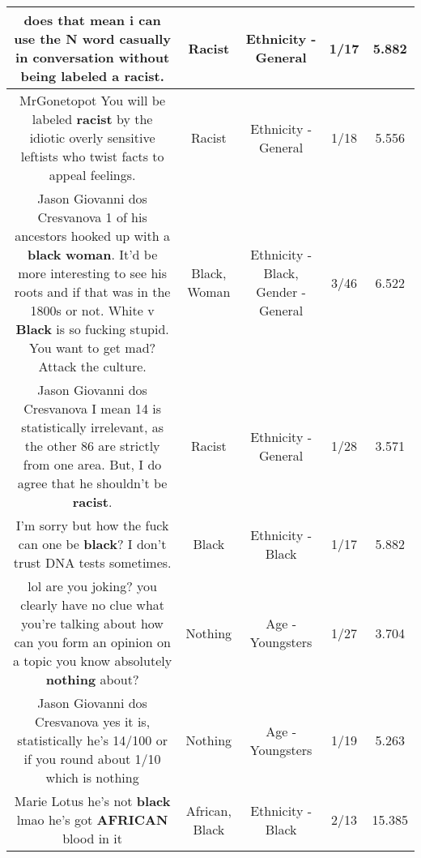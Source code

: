 \documentclass[11pt]{article}
\newlength\mylength
\begin{document}
\begin{center}
\begin{longtable}{|C{.65\mylength}|C{.30\mylength}|C{.12\mylength}|C{.12\mylength}|C{.12\mylength}|}
  \small does that mean i can use the N word casually in conversation without being labeled a \textbf{racist}.\normalsize   & Racist & Ethnicity - General & 1/17 & 5.882 \\  \hline
  \small MrGonetopot You will be labeled \textbf{racist} by the idiotic overly sensitive leftists who twist facts to appeal feelings.\normalsize   & Racist & Ethnicity - General & 1/18 & 5.556 \\  \hline
  \small Jason Giovanni dos Cresvanova 1 of his ancestors hooked up with a \textbf{black} \textbf{woman}. It'd be more interesting to see his roots and if that was in the 1800s or not. White v \textbf{Black} is so fucking stupid. You want to get mad? Attack the culture.\normalsize   & Black, Woman & Ethnicity - Black, Gender - General & 3/46 & 6.522 \\  \hline
  \small Jason Giovanni dos Cresvanova I mean 14 is statistically irrelevant, as the other 86 are strictly from one area. But, I do agree that he shouldn't be \textbf{racist}.\normalsize   & Racist & Ethnicity - General & 1/28 & 3.571 \\  \hline
  \small I'm sorry but how the fuck can one be  \textbf{black}? I don't trust DNA tests sometimes.\normalsize   & Black & Ethnicity - Black & 1/17 & 5.882 \\  \hline
  \small lol are you joking? you clearly have no clue what you're talking about how can you form an opinion on a topic you know absolutely \textbf{nothing} about?\normalsize   & Nothing & Age - Youngsters & 1/27 & 3.704 \\  \hline
  \small Jason Giovanni dos Cresvanova yes it is, statistically he's 14/100 or if you round about 1/10 which is nothing\normalsize   & Nothing & Age - Youngsters & 1/19 & 5.263 \\  \hline
  \small Marie Lotus he's not  \textbf{black} lmao he's got \textbf{AFRICAN} blood in it\normalsize   & African, Black & Ethnicity - Black & 2/13 & 15.385 \\  \hline

\end{longtable}
\end{center}
\end{document}
